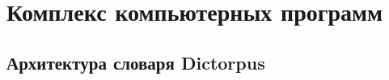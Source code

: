 \chapter{Комплекс компьютерных программ} \label{chapt_complex_software}









\section{Архитектура словаря Dictorpus} \label{sect_dictionary}








